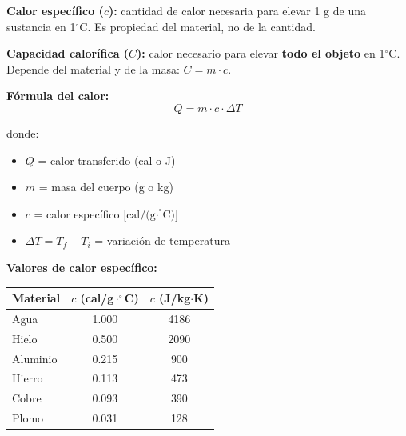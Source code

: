 \begin{seccion}
\begin{definicion}
\textbf{Calor específico ($c$):} cantidad de calor necesaria para elevar 1 g de una sustancia en 1$^\circ$C. Es propiedad del material, no de la cantidad.
\end{definicion}

\begin{definicion}
\textbf{Capacidad calorífica ($C$):} calor necesario para elevar \textbf{todo el objeto} en 1$^\circ$C. Depende del material y de la masa: $C = m \cdot c$.
\end{definicion}

\begin{ecuacion}
\textbf{Fórmula del calor:}
$$Q = m \cdot c \cdot \Delta T$$

donde:
\begin{itemize}
    \item $Q$ = calor transferido (cal o J)
    \item $m$ = masa del cuerpo (g o kg)
    \item $c$ = calor específico $\bigl[\text{cal/(g·}^\circ\text{C)}\bigr]$
    \item $\Delta T = T_f - T_i$ = variación de temperatura
\end{itemize}
\end{ecuacion}

\textbf{Valores de calor específico:}

\vspace{0.3cm}
\begin{center}
\begin{tabular}{lcc}
\hline
\rowcolor{azuloscuro!15}
\textbf{Material} & \textbf{$c$ (cal/g$\cdot^\circ$C)} & \textbf{$c$ (J/kg$\cdot$K)} \\
\hline
Agua              & 1.000 & 4186 \\
\rowcolor{fondogris}
Hielo             & 0.500 & 2090 \\
Aluminio          & 0.215 & 900  \\
\rowcolor{fondogris}
Hierro            & 0.113 & 473  \\
Cobre             & 0.093 & 390  \\
\rowcolor{fondogris}
Plomo             & 0.031 & 128  \\
\hline
\end{tabular}
\end{center}
\vspace{0.3cm}
\end{seccion}

